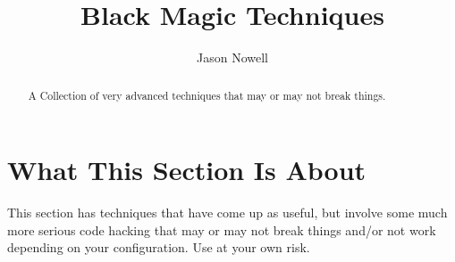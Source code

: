 \documentclass{ximera}
\title{Black Magic Techniques}
\author{Jason Nowell}
\begin{document}
\begin{abstract}
    A Collection of very advanced techniques that may or may not break things.
\end{abstract}
\maketitle
   
   
\section*{What This Section Is About}
    This section has techniques that have come up as useful, but involve some much more serious code hacking that may or may not break things and/or not work depending on your configuration. Use at your own risk.
        
\end{document}

